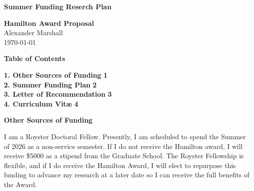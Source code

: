 
\clearpage

 \newenvironment{indented}{%
    \par %
    \setlength{\parindent}{2em} %
    \indent %
}{%
    \par %
}
\recipient{}{} %
\date{\today} %
\opening{\textbf{Summer Funding Reserch Plan}} %
\closing{} %

\begin{center}
    
    \vspace*{4cm} %
    
    {\Huge \textbf{Hamilton Award Proposal}} \\ [1.5cm]
    {\Large Alexander Marshall} \\ [0.5cm]
    {\large \today}
    
    \vfill %
\end{center}

\begin{center}
    {\Large \textbf{Table of Contents}}
\end{center}

\vspace{1cm}

\noindent \textbf{1. Other Sources of Funding} \dotfill \textbf{1}\\
\noindent \textbf{2. Summer Funding Plan} \dotfill \textbf{2} \\
\noindent \textbf{3. Letter of Recommendation} \dotfill \textbf{3}\\
\noindent \textbf{4. Curriculum Vit\ae} \dotfill \textbf{4}\\ 
\par \vspace{2cm}
\textbf{Other Sources of Funding}\par
I am a Royster Doctoral Fellow. Presently, I am scheduled to spend the Summer of 2026 as a non-service semester. If I do not receive the Hamilton award, I will receive \$5000 as a stipend from the Graduate School. The Royster Fellowship is flexible, and if I do receive the Hamilton Award, I will elect to repurpose this funding to advance my research at a later date so I can receive the full benefits of the Award.


